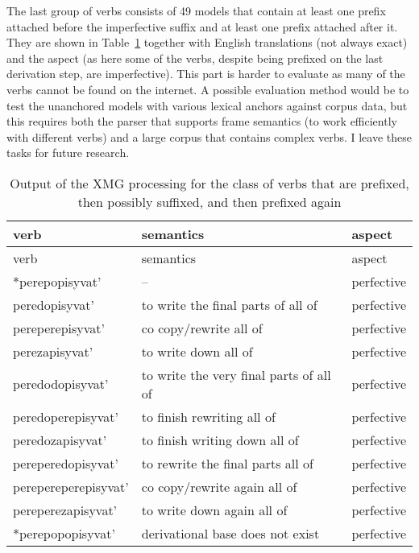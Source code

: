 The last group of verbs consists of 49 models that contain at least one prefix attached before the imperfective suffix and at least one prefix attached after it. They are shown in Table~\ref{table:prefsuffverbs} together with English translations (not always exact) and the aspect (as here some of the verbs, despite being prefixed on the last derivation step, are imperfective). This part is harder to evaluate as many of the verbs cannot be found on the internet. A possible evaluation method would be to test the unanchored models with various lexical anchors against corpus data, but this requires both the parser that supports frame semantics (to work efficiently with different verbs) and a large corpus that contains complex verbs. I leave these tasks for future research.
 
\begin{longtable}{lll}
\caption{Output of the XMG processing for the class of verbs that are prefixed, then possibly suffixed, and then prefixed again \label{table:prefsuffverbs}}\\
\lsptoprule verb  & semantics & aspect\\ \midrule\endfirsthead%
\midrule verb  & semantics & aspect\\ \midrule\endhead\endfoot\lspbottomrule\endlastfoot
*perepopisyvat' & -- & perfective \\ 
peredopisyvat' & to write the final parts of all of & perfective \\ 
pereperepisyvat' & co copy/rewrite all of & perfective \\ 
perezapisyvat' & to write down all of & perfective \\ 
peredodopisyvat' & to write the very final parts of all of & perfective \\ 
peredoperepisyvat' & to finish rewriting all of & perfective \\ 
peredozapisyvat' & to finish writing down all of & perfective \\ 
pereperedopisyvat' & to rewrite the final parts all of & perfective \\ 
perepereperepisyvat' & co copy/rewrite again all of & perfective \\ 
pereperezapisyvat' & to write down again all of & perfective \\ 
*perepopopisyvat' & derivational base does not exist & perfective \\\midrule


\end{longtable}
